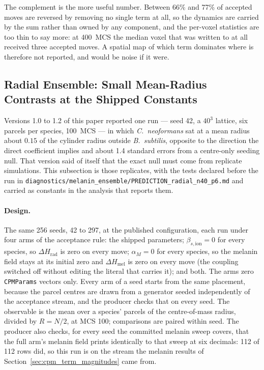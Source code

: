 \documentclass[11pt]{article}
\begin{document}
The complement is the more useful number. Between 66\% and 77\% of accepted moves are reversed by
removing no single term at all, so the dynamics are carried by the sum rather than owned by any
component, and the per-voxel statistics are too thin to say more: at 400~MCS the median voxel that
was written to at all received three accepted moves. A spatial map of which term dominates where is
therefore not reported, and would be noise if it were.

\subsection{Radial Ensemble: Small Mean-Radius Contrasts at the Shipped Constants}
\label{sec:radial_ensemble}

Versions 1.0 to 1.2 of this paper reported one run --- seed 42, a $40^3$ lattice, six parcels
per species, 100~MCS --- in which \textit{C.~neoformans} sat at a mean radius about $0.15$ of the
cylinder radius outside \textit{B.~subtilis}, opposite to the direction the direct coefficient
implies and about 1.4 standard errors from a centre-only seeding null. That version said of itself
that the exact null must come from replicate simulations. This subsection is those replicates,
with the tests declared before the run in
\texttt{diagnostics/melanin\_ensemble/PREDICTION\_radial\_n40\_p6.md} and carried as constants in
the analysis that reports them.

\paragraph{Design.} The same 256 seeds, 42 to 297, at the published configuration, each run under
four arms of the acceptance rule: the shipped parameters; $\beta_{s,\mathrm{ion}} = 0$ for every
species, so $\Delta H_{\mathrm{rad}}$ is zero on every move; $\alpha_M = 0$ for every species, so
the melanin field stays at its initial zero and $\Delta H_{\mathrm{mel}}$ is zero on every move
(the coupling switched off without editing the literal that carries it); and both. The arms zero
\texttt{CPMParams} vectors only. Every arm of a seed starts from the same placement, because the
parcel centres are drawn from a generator seeded independently of the acceptance stream, and the
producer checks that on every seed. The observable is the mean over a species' parcels of the
centre-of-mass radius, divided by $R = N/2$, at MCS 100; comparisons are paired within seed. The
producer also checks, for every seed the committed melanin sweep covers, that the full arm's
melanin field prints identically to that sweep at six decimals: 112 of 112 rows did, so this run
is on the stream the melanin results of Section~\ref{sec:cpm_term_magnitudes} came from.
\end{document}
